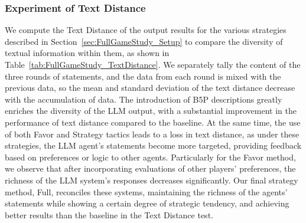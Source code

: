 \subsubsection{Experiment of Text Distance }

We compute the Text Distance of the output results for the various strategies described in Section~\ref{sec:FullGameStudy_Setup} to compare the diversity of textual information within them, as shown in Table~\ref{tab:FullGameStudy_TextDistance}. We separately tally the content of the three rounds of statements, and the data from each round is mixed with the previous data, so the mean and standard deviation of the text distance decrease with the accumulation of data. The introduction of B5P descriptions greatly enriches the diversity of the LLM output, with a substantial improvement in the performance of text distance compared to the baseline. At the same time, the use of both Favor and Strategy tactics leads to a loss in text distance, as under these strategies, the LLM agent's statements become more targeted, providing feedback based on preferences or logic to other agents. Particularly for the Favor method, we observe that after incorporating evaluations of other players' preferences, the richness of the LLM system's responses decreases significantly. Our final strategy method, Full, reconciles these systems, maintaining the richness of the agents' statements while showing a certain degree of strategic tendency, and achieving better results than the baseline in the Text Distance test.




